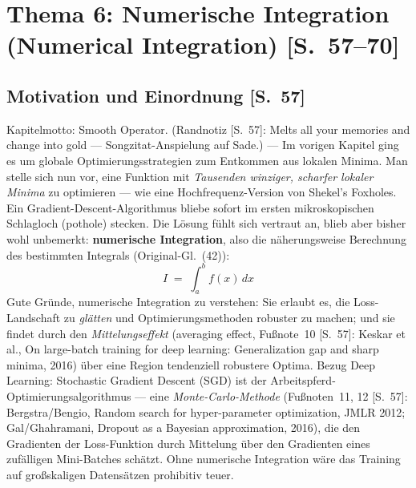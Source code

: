 \section{Thema 6: Numerische Integration (Numerical Integration) [S.~57--70]}

\subsection{Motivation und Einordnung [S.~57]}

Kapitelmotto: \glqq Smooth Operator.\grqq{} (Randnotiz [S.~57]: \glqq Melts all your
memories and change into gold\grqq{} --- Songzitat-Anspielung auf Sade.) --- Im vorigen
Kapitel ging es um globale Optimierungsstrategien zum Entkommen aus lokalen Minima.
Man stelle sich nun vor, eine Funktion mit \emph{Tausenden winziger, scharfer lokaler
Minima} zu optimieren --- wie eine Hochfrequenz-Version von Shekel's Foxholes. Ein
Gradient-Descent-Algorithmus bliebe sofort im ersten mikroskopischen
\glqq Schlagloch\grqq{} (pothole) stecken. Die Lösung fühlt sich vertraut an, blieb aber
bisher wohl unbemerkt: \textbf{numerische Integration}, also die näherungsweise
Berechnung des bestimmten Integrals (Original-Gl.~(42)):
\[
  I \;=\; \int_a^b f(x)\,dx \tag{42}
\]
Gute Gründe, numerische Integration zu verstehen: Sie erlaubt es, die Loss-Landschaft
zu \emph{glätten} und Optimierungsmethoden robuster zu machen; und sie findet durch
den \emph{Mittelungseffekt} (averaging effect, Fu{\ss}note~10 [S.~57]: Keskar et al.,
\glqq On large-batch training for deep learning: Generalization gap and sharp
minima\grqq, 2016) über eine Region tendenziell robustere Optima. Bezug Deep Learning:
Stochastic Gradient Descent (SGD) ist der Arbeitspferd-Optimierungsalgorithmus ---
eine \emph{Monte-Carlo-Methode} (Fu{\ss}noten~11, 12 [S.~57]: Bergstra/Bengio,
\glqq Random search for hyper-parameter optimization\grqq, JMLR 2012; Gal/Ghahramani,
\glqq Dropout as a Bayesian approximation\grqq, 2016), die den Gradienten der
Loss-Funktion durch Mittelung über den Gradienten eines zufälligen Mini-Batches
schätzt. Ohne numerische Integration wäre das Training auf gro{\ss}skaligen
Datensätzen prohibitiv teuer.

